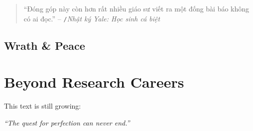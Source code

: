\documentclass{article}
\numberwithin{equation}{section}
\begin{document}
\begin{quotation}
	``Đóng góp này còn hơn rất nhiều giáo sư viết ra một đống bài báo không có ai đọc.'' -- \cite{VHV's blog}\texttt{/}\textit{Nhật ký Yale: Học sinh cá biệt}
\end{quotation}

\subsection{Wrath \& Peace}

\section{Beyond Research Careers}
This text is still growing:
\begin{flushright}
	\textit{``The quest for perfection can never end.''}
\end{flushright}

\end{document}
